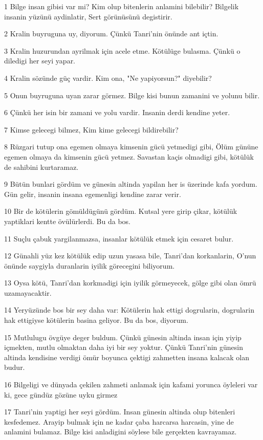 \par 1 Bilge insan gibisi var mi? Kim olup bitenlerin anlamini bilebilir? Bilgelik insanin yüzünü aydinlatir, Sert görünüsünü degistirir.
\par 2 Kralin buyruguna uy, diyorum. Çünkü Tanri'nin önünde ant içtin.
\par 3 Kralin huzurundan ayrilmak için acele etme. Kötülüge bulasma. Çünkü o diledigi her seyi yapar.
\par 4 Kralin sözünde güç vardir. Kim ona, "Ne yapiyorsun?" diyebilir?
\par 5 Onun buyruguna uyan zarar görmez. Bilge kisi bunun zamanini ve yolunu bilir.
\par 6 Çünkü her isin bir zamani ve yolu vardir. Insanin derdi kendine yeter.
\par 7 Kimse gelecegi bilmez, Kim kime gelecegi bildirebilir?
\par 8 Rüzgari tutup ona egemen olmaya kimsenin gücü yetmedigi gibi, Ölüm gününe egemen olmaya da kimsenin gücü yetmez. Savastan kaçis olmadigi gibi, kötülük de sahibini kurtaramaz.
\par 9 Bütün bunlari gördüm ve günesin altinda yapilan her is üzerinde kafa yordum. Gün gelir, insanin insana egemenligi kendine zarar verir.
\par 10 Bir de kötülerin gömüldügünü gördüm. Kutsal yere girip çikar, kötülük yaptiklari kentte övülürlerdi. Bu da bos.
\par 11 Suçlu çabuk yargilanmazsa, insanlar kötülük etmek için cesaret bulur.
\par 12 Günahli yüz kez kötülük edip uzun yasasa bile, Tanri'dan korkanlarin, O'nun önünde saygiyla duranlarin iyilik görecegini biliyorum.
\par 13 Oysa kötü, Tanri'dan korkmadigi için iyilik görmeyecek, gölge gibi olan ömrü uzamayacaktir.
\par 14 Yeryüzünde bos bir sey daha var: Kötülerin hak ettigi dogrularin, dogrularin hak ettigiyse kötülerin basina geliyor. Bu da bos, diyorum.
\par 15 Mutlulugu övgüye deger buldum. Çünkü günesin altinda insan için yiyip içmekten, mutlu olmaktan daha iyi bir sey yoktur. Çünkü Tanri'nin günesin altinda kendisine verdigi ömür boyunca çektigi zahmetten insana kalacak olan budur.
\par 16 Bilgeligi ve dünyada çekilen zahmeti anlamak için kafami yorunca öyleleri var ki, gece gündüz gözüne uyku girmez
\par 17 Tanri'nin yaptigi her seyi gördüm. Insan günesin altinda olup bitenleri kesfedemez. Arayip bulmak için ne kadar çaba harcarsa harcasin, yine de anlamini bulamaz. Bilge kisi anladigini söylese bile gerçekten kavrayamaz.

